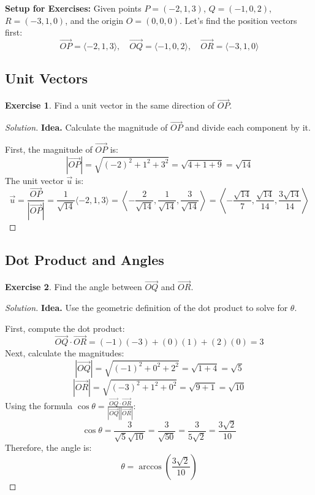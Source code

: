 \documentclass[11pt]{article}
\theoremstyle{definition}
\newtheorem{exercise}{Exercise}[section]
\newenvironment{solution}{\begin{proof}[Solution]}{\end{proof}}
\begin{document}
\textbf{Setup for Exercises:} Given points $P=(-2,1,3)$, $Q=(-1,0,2)$, $R=(-3,1,0)$, and the origin $O=(0,0,0)$. Let's find the position vectors first:
\[ \vec{OP} = \langle -2, 1, 3 \rangle, \quad \vec{OQ} = \langle -1, 0, 2 \rangle, \quad \vec{OR} = \langle -3, 1, 0 \rangle \]

\subsection{Unit Vectors}

\begin{exercise}
Find a unit vector in the same direction of $\vec{OP}$.
\end{exercise}

\begin{solution}
\textbf{Idea.} Calculate the magnitude of $\vec{OP}$ and divide each component by it.

First, the magnitude of $\vec{OP}$ is:
\[ |\vec{OP}| = \sqrt{(-2)^2 + 1^2 + 3^2} = \sqrt{4 + 1 + 9} = \sqrt{14} \]
The unit vector $\vec{u}$ is:
\[ \vec{u} = \frac{\vec{OP}}{|\vec{OP}|} = \frac{1}{\sqrt{14}} \langle -2, 1, 3 \rangle = \left\langle -\frac{2}{\sqrt{14}}, \frac{1}{\sqrt{14}}, \frac{3}{\sqrt{14}} \right\rangle = \left\langle -\frac{\sqrt{14}}{7}, \frac{\sqrt{14}}{14}, \frac{3\sqrt{14}}{14} \right\rangle \]
\end{solution}

\subsection{Dot Product and Angles}

\begin{exercise}
Find the angle between $\vec{OQ}$ and $\vec{OR}$.
\end{exercise}

\begin{solution}
\textbf{Idea.} Use the geometric definition of the dot product to solve for $\theta$.

First, compute the dot product:
\[ \vec{OQ} \cdot \vec{OR} = (-1)(-3) + (0)(1) + (2)(0) = 3 \]
Next, calculate the magnitudes:
\[ |\vec{OQ}| = \sqrt{(-1)^2 + 0^2 + 2^2} = \sqrt{1 + 4} = \sqrt{5} \]
\[ |\vec{OR}| = \sqrt{(-3)^2 + 1^2 + 0^2} = \sqrt{9 + 1} = \sqrt{10} \]
Using the formula $\cos \theta = \frac{\vec{OQ} \cdot \vec{OR}}{|\vec{OQ}| |\vec{OR}|}$:
\[ \cos \theta = \frac{3}{\sqrt{5}\sqrt{10}} = \frac{3}{\sqrt{50}} = \frac{3}{5\sqrt{2}} = \frac{3\sqrt{2}}{10} \]
Therefore, the angle is:
\[ \theta = \arccos \left( \frac{3\sqrt{2}}{10} \right) \]
\end{solution}
\end{document}

